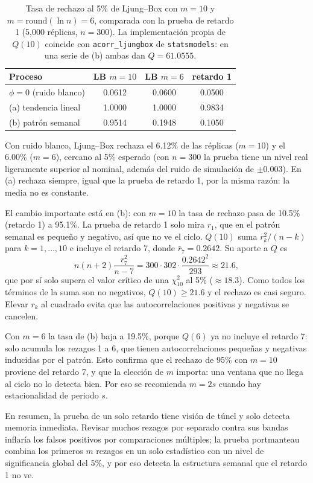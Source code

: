 \documentclass[11pt]{article}
\begin{document}
\begin{table}[H]
\centering
\begin{tabular}{l|c|c|c}
\hline
Proceso & LB $m=10$ & LB $m=6$ & retardo 1 \\
\hline
$\phi=0$ (ruido blanco) & 0.0612 & 0.0600 & 0.0500 \\
(a) tendencia lineal    & 1.0000 & 1.0000 & 0.9834 \\
(b) patr\'on semanal    & 0.9514 & 0.1948 & 0.1050 \\
\hline
\end{tabular}
\caption{Tasa de rechazo al 5\% de Ljung--Box con $m=10$ y
$m=\mathrm{round}(\ln n)=6$, comparada con la prueba de retardo 1 (5{,}000
r\'eplicas, $n=300$). La implementaci\'on propia de $Q(10)$ coincide con
\texttt{acorr\_ljungbox} de \texttt{statsmodels}: en una serie de (b) ambas
dan $Q=61.0555$.}
\label{tab:p05}
\end{table}

Con ruido blanco, Ljung--Box rechaza el 6.12\% de las r\'eplicas ($m=10$) y el
6.00\% ($m=6$), cercano al 5\% esperado (con $n=300$ la prueba tiene un nivel
real ligeramente superior al nominal, adem\'as del ruido de simulaci\'on de
$\pm0.003$). En (a) rechaza siempre, igual que la prueba de retardo 1, por la
misma raz\'on: la media no es constante.

El cambio importante est\'a en (b): con $m=10$ la tasa de rechazo pasa de
10.5\% (retardo 1) a 95.1\%. La prueba de retardo 1 solo mira $r_1$, que en el
patr\'on semanal es peque\~no y negativo, as\'i que no ve el ciclo. $Q(10)$
suma $r_k^2/(n-k)$ para $k=1,\dots,10$ e incluye el retardo 7, donde
$\bar r_7=0.2642$. Su aporte a $Q$ es
\[
n(n+2)\frac{r_7^2}{n-7}=300\cdot302\cdot\frac{0.2642^2}{293}\approx 21.6,
\]
que por s\'i solo supera el valor cr\'itico de una $\chi^2_{10}$ al 5\%
($\approx 18.3$). Como todos los t\'erminos de la suma son no negativos,
$Q(10)\ge 21.6$ y el rechazo es casi seguro. Elevar $r_k$ al cuadrado evita
que las autocorrelaciones positivas y negativas se cancelen.

Con $m=6$ la tasa de (b) baja a 19.5\%, porque $Q(6)$ ya no incluye el retardo
7: solo acumula los rezagos 1 a 6, que tienen autocorrelaciones peque\~nas y
negativas inducidas por el patr\'on. Esto confirma que el rechazo de 95\% con
$m=10$ proviene del retardo 7, y que la elecci\'on de $m$ importa: una
ventana que no llega al ciclo no lo detecta bien. Por eso se recomienda
$m=2s$ cuando hay estacionalidad de periodo $s$.

En resumen, la prueba de un solo retardo tiene visi\'on de t\'unel y solo
detecta memoria inmediata. Revisar muchos rezagos por separado contra sus
bandas inflar\'ia los falsos positivos por comparaciones m\'ultiples; la
prueba portmanteau combina los primeros $m$ rezagos en un solo estad\'istico
con un nivel de significancia global del 5\%, y por eso detecta la estructura
semanal que el retardo 1 no ve.
\end{document}

